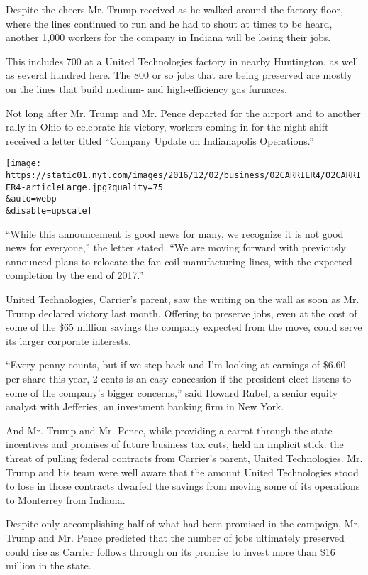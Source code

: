 Despite the cheers Mr. Trump received as he walked around the factory
floor, where the lines continued to run and he had to shout at times to
be heard, another 1,000 workers for the company in Indiana will be
losing their jobs.

This includes 700 at a United Technologies factory in nearby Huntington,
as well as several hundred here. The 800 or so jobs that are being
preserved are mostly on the lines that build medium- and high-efficiency
gas furnaces.

Not long after Mr. Trump and Mr. Pence departed for the airport and to
another rally in Ohio to celebrate his victory, workers coming in for
the night shift received a letter titled ``Company Update on
Indianapolis Operations.''

\texttt{[image: https://static01.nyt.com/images/2016/12/02/business/02CARRIER4/02CARRIER4-articleLarge.jpg?quality=75\\\&auto=webp\\\&disable=upscale]}

``While this announcement is good news for many, we recognize it is not
good news for everyone,'' the letter stated. ``We are moving forward
with previously announced plans to relocate the fan coil manufacturing
lines, with the expected completion by the end of 2017.''

United Technologies, Carrier's parent, saw the writing on the wall as
soon as Mr. Trump declared victory last month. Offering to preserve
jobs, even at the cost of some of the \$65 million savings the company
expected from the move, could serve its larger corporate interests.

``Every penny counts, but if we step back and I'm looking at earnings of
\$6.60 per share this year, 2 cents is an easy concession if the
president-elect listens to some of the company's bigger concerns,'' said
Howard Rubel, a senior equity analyst with Jefferies, an investment
banking firm in New York.

And Mr. Trump and Mr. Pence, while providing a carrot through the state
incentives and promises of future business tax cuts, held an implicit
stick: the threat of pulling federal contracts from Carrier's parent,
United Technologies. Mr. Trump and his team were well aware that the
amount United Technologies stood to lose in those contracts dwarfed the
savings from moving some of its operations to Monterrey from Indiana.

Despite only accomplishing half of what had been promised in the
campaign, Mr. Trump and Mr. Pence predicted that the number of jobs
ultimately preserved could rise as Carrier follows through on its
promise to invest more than \$16 million in the state.

